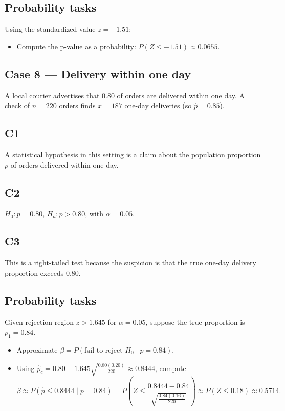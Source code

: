 \begin{ExamProblems}
		\subsection*{Probability tasks}
		Using the standardized value \(z=-1.51\):
		\begin{itemize}
			\item Compute the p-value as a probability: \(P(Z\le -1.51)\approx 0.0655\).
		\end{itemize}

		\item
		\subsection*{Case 8 — Delivery within one day}
		A local courier advertises that 0.80 of orders are delivered within one day. A check of \(n=220\) orders finds \(x=187\) one-day deliveries (so \(\hat p=0.85\)).

		\subsection*{C1}
		A statistical hypothesis in this setting is a claim about the population proportion \(p\) of orders delivered within one day.

		\subsection*{C2}
		\(H_0\colon p=0.80\), \(H_a\colon p>0.80\), with \(\alpha=0.05\).

		\subsection*{C3}
		This is a right-tailed test because the suspicion is that the true one-day delivery proportion exceeds 0.80.

		\subsection*{Probability tasks}
		Given rejection region \(z>1.645\) for \(\alpha=0.05\), suppose the true proportion is \(p_1=0.84\).
		\begin{itemize}
			\item Approximate \(\beta=P(\text{fail to reject }H_0\mid p=0.84)\).
			\item Using \(\hat p_c=0.80+1.645\sqrt{\frac{0.80(0.20)}{220}}\approx 0.8444\), compute
			\[
			\beta\approx P\!\left(\hat p\le 0.8444\mid p=0.84\right)
			= P\!\left(Z\le \frac{0.8444-0.84}{\sqrt{\frac{0.84(0.16)}{220}}}\right)
			\approx P(Z\le 0.18)\approx 0.5714.
			\]
		\end{itemize}

	\end{ExamProblems}

